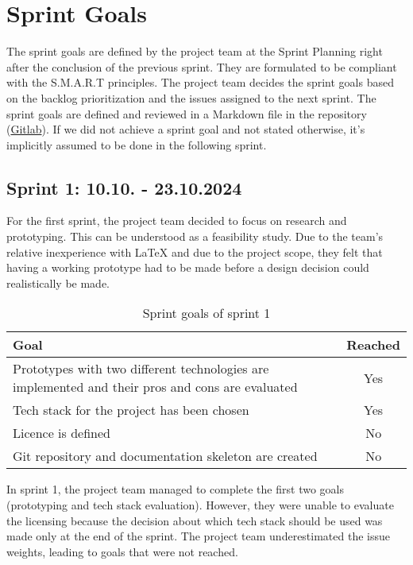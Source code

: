 \section{Sprint Goals}\label{sec:sprint-goals}
The sprint goals are defined by the project team at the Sprint Planning right after the conclusion of the previous sprint.
They are formulated to be compliant with the S.M.A.R.T principles.
The project team decides the sprint goals based on the backlog
prioritization and the issues assigned to the next sprint.
The sprint goals are defined and reviewed in a Markdown file in the repository (\href{https://gitlab.ti.bfh.ch/decibel-threshold-event-displayer/decibel-threshold-event-displayer/-/blob/main/doc/scrum/sprints.md}{Gitlab}).
If we did not achieve a sprint goal and not stated otherwise, it's implicitly assumed to be done in the following sprint.

\subsection{Sprint 1: 10.10. - 23.10.2024}\label{subsec:sprint-1}
For the first sprint, the project team decided to focus on research and prototyping.
This can be understood as a feasibility study.
Due to the team's relative inexperience with LaTeX and due to the project scope, they felt that having a working prototype had to be
made before a design decision could realistically be made. \\
\begin{table}[H]
    \centering
    \begin{tabularx}{\textwidth}{X c}
        \toprule
        \textbf{Goal}                                                                                    & \textbf{Reached} \\
        \midrule
        Prototypes with two different technologies are implemented and their pros and cons are evaluated & Yes              \\
        \midrule
        Tech stack for the project has been chosen                                                       & Yes              \\
        \midrule
        Licence is defined                                                                               & No               \\
        \midrule
        Git repository and documentation skeleton are created                                            & No               \\
        \bottomrule
    \end{tabularx}
    \caption{Sprint goals of sprint 1}\label{tab:sprint_goals1}
\end{table}
In sprint 1, the project team managed to complete the first two goals (prototyping and tech stack evaluation).
However, they were unable to evaluate the licensing because the decision about which tech stack should be used was made only at the end of the sprint.
The project team underestimated the issue weights, leading to goals that were not reached.

